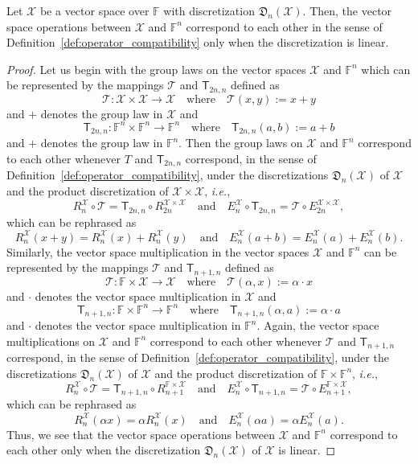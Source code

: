 \documentclass[a4paper]{paper}
\newcommand{\Discr}{\mathfrak{D}}
\newcommand{\VecSpace}[1]{\mathscr{#1}}
\newcommand{\Field}{\mathbb{F}}
\newcommand{\Op}[1]{\mathcal{#1}}
\newcommand{\DiscOp}[1]{\mathsf{#1}}
\newcommand*{\EXT}[2]{\ensuremath{E_{#1}^{#2}}}
\newcommand*{\REST}[2]{\ensuremath{R_{#1}^{#2}}}
\newcommand*{\RnX}{\ensuremath{\REST{n}{\VecSpace{X}}}}
\newcommand*{\EnX}{\ensuremath{\EXT{n}{\VecSpace{X}}}}
\newcommand{\ie}{\textsl{i.e.}\xspace}
\begin{document}
\begin{theorem}
 \label{ThmVecSpaceCorr}
 Let $\VecSpace{X}$ be a vector space over $\Field$ with discretization $\Discr_{n}(\VecSpace{X})$. Then,
 the vector space operations between $\VecSpace{X}$ and $\Field^{n}$ correspond
 to each other in the sense of Definition~\ref{def:operator_compatibility} only when the discretization is linear.
\end{theorem}
\begin{proof}
Let us begin with the  group laws on the vector spaces $\VecSpace{X}$ and $\Field^{n}$ which can be 
represented by the mappings $\Op{T}$ and $\DiscOp{T}_{2n,n}$ defined as  
\[ \Op{T} \colon \VecSpace{X} \times \VecSpace{X} \to \VecSpace{X} 
    \quad\text{where}\quad \Op{T}(x,y):=x+y \] 
and $+$ denotes the group law in $\VecSpace{X}$ and 
\[ \DiscOp{T}_{2n,n} \colon \Field^{n} \times \Field^{n} \to \Field^{n} 
   \quad\text{where}\quad \DiscOp{T}_{2n,n}(a,b):=a+b \] 
and $+$ denotes the group law in $\Field^{n}$. Then the group laws on $\VecSpace{X}$ and $\Field^{n}$ 
correspond to each other whenever $T$ and $\DiscOp{T}_{2n,n}$ correspond,
in the sense of Definition~\ref{def:operator_compatibility},  under the discretizations $\Discr_{n}(\VecSpace{X})$ of $\VecSpace{X}$ 
and the product discretization of $\VecSpace{X}\times \VecSpace{X}$, \ie,
\[ \RnX \circ \Op{T} =  \DiscOp{T}_{2n,n} \circ R_{2n}^{\VecSpace{X}\times \VecSpace{X}} 
   \quad\text{and}\quad 
   \EnX\circ \DiscOp{T}_{2n,n} = \Op{T} \circ E_{2n}^{\VecSpace{X}\times \VecSpace{X}},
\]
which can be rephrased as
\[ \RnX(x+y) =  \RnX(x)+\RnX(y) 
   \quad\text{and}\quad 
   \EnX(a+b) = \EnX(a)+\EnX(b).
\]
Similarly, the vector space multiplication in the vector spaces $\VecSpace{X}$ and $\Field^{n}$ 
can be represented by the mappings $\Op{T}$ and $\DiscOp{T}_{n+1,n}$ defined as
\[ \Op{T} \colon \Field \times \VecSpace{X} \to \VecSpace{X} 
   \quad\text{where}\quad \Op{T}(\alpha,x):=\alpha \cdot x \] 
and $\cdot$ denotes the vector space multiplication in $\VecSpace{X}$ and 
\[ \DiscOp{T}_{n+1,n} \colon  \Field \times \Field^{n} \to \Field^{n} 
   \quad\text{where}\quad \DiscOp{T}_{n+1,n}(\alpha,a):=\alpha\cdot a  \] 
and $\cdot$ denotes the vector space multiplication in $\Field^{n}$. Again, 
the vector space multiplications on $\VecSpace{X}$ and $\Field^{n}$ 
correspond to each other whenever $\Op{T}$ and $\DiscOp{T}_{n+1,n}$ correspond,
in the sense of Definition~\ref{def:operator_compatibility}, under the discretizations $\Discr_{n}(\VecSpace{X})$ of $\VecSpace{X}$ 
and the product discretization of  $\Field \times \Field^{n}$, \ie,
\[ \RnX \circ \Op{T} =  \DiscOp{T}_{n+1,n} \circ R_{n+1}^{\Field \times \VecSpace{X}}
   \quad\text{and}\quad 
   \EnX\circ \DiscOp{T}_{n+1,n} =  \Op{T} \circ E_{n+1}^{\Field \times \VecSpace{X}},
\]
which can be rephrased as
\[ \RnX(\alpha x) =  \alpha \RnX(x) 
   \quad\text{and}\quad 
   \EnX(\alpha a) = \alpha \EnX(a).
\]
Thus, we see that the vector space operations between $\VecSpace{X}$ and $\Field^{n}$ correspond
to each other only when the discretization $\Discr_{n}(\VecSpace{X})$ of $\VecSpace{X}$ is linear.
\end{proof}
\end{document}
